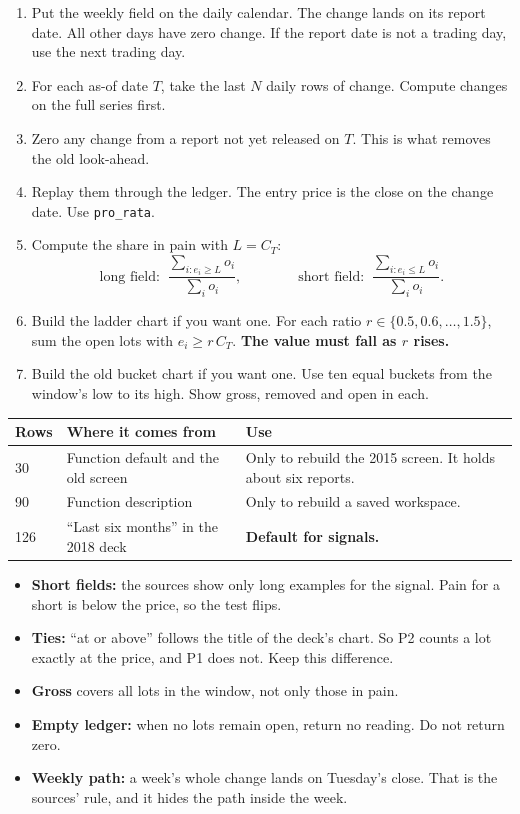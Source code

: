 \documentclass[11pt,a4paper]{article}
\newcommand{\code}[1]{\nolinkurl{#1}}
\newcommand{\sublabel}[1]{\par\vspace{3pt}\needspace{3\baselineskip}{\sffamily\small\bfseries #1}\par\nopagebreak[4]\vspace{1pt}}
\begin{document}
\sublabel{Steps}
\begin{enumerate}
\item Put the weekly field on the daily calendar. The change lands on its report date. All other days have zero change. If the report date is not a trading day, use the next trading day.
\item For each as-of date $T$, take the last $N$ daily rows of change. Compute changes on the full series first.
\item Zero any change from a report not yet released on $T$. This is what removes the old look-ahead.
\item Replay them through the ledger. The entry price is the close on the change date. Use \code{pro_rata}.
\item Compute the share in pain with $L = C_T$:
\[
\text{long field:}\;\; \frac{\sum_{i: e_i \ge L} o_i}{\sum_i o_i}, \qquad\qquad \text{short field:}\;\; \frac{\sum_{i: e_i \le L} o_i}{\sum_i o_i} .
\]
\item Build the ladder chart if you want one. For each ratio $r \in \{0.5, 0.6, \dots, 1.5\}$, sum the open lots with $e_i \ge r\, C_T$. \textbf{The value must fall as $r$ rises.}
\item Build the old bucket chart if you want one. Use ten equal buckets from the window's low to its high. Show gross, removed and open in each.
\end{enumerate}

\sublabel{Choose the window}
\begin{center}\small
\begin{tabular}{@{}lll@{}}
\toprule
Rows & Where it comes from & Use \\
\midrule
30 & Function default and the old screen & Only to rebuild the 2015 screen. It holds about six reports. \\
90 & Function description & Only to rebuild a saved workspace. \\
126 & ``Last six months'' in the 2018 deck & \textbf{Default for signals.} \\
\bottomrule
\end{tabular}
\end{center}

\begin{decision}
\begin{itemize}[leftmargin=*]
\item \textbf{Short fields:} the sources show only long examples for the signal. Pain for a short is below the price, so the test flips.
\item \textbf{Ties:} ``at or above'' follows the title of the deck's chart. So P2 counts a lot exactly at the price, and P1 does not. Keep this difference.
\item \textbf{Gross} covers all lots in the window, not only those in pain.
\item \textbf{Empty ledger:} when no lots remain open, return no reading. Do not return zero.
\item \textbf{Weekly path:} a week's whole change lands on Tuesday's close. That is the sources' rule, and it hides the path inside the week.
\end{itemize}
\end{decision}
\end{document}
